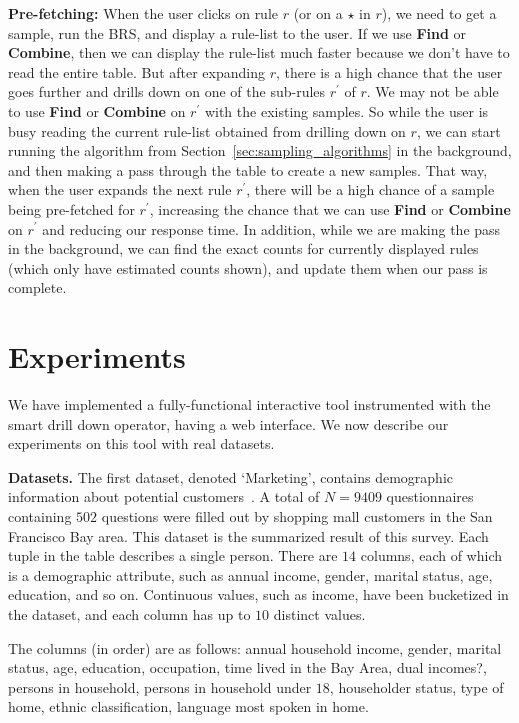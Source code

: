 \documentclass[10pt,journal,compsoc]{IEEEtran}
\newcommand{\stitle}[1]{\vspace{0.5em}\noindent\textbf{#1}}
\newcommand{\techreporttext}[1]{#1}
\begin{document}
\techreporttext{
\noindent \textbf{Pre-fetching:} When the user clicks on rule $r$ (or on a $\star$ in $r$), we need to get a sample, run the BRS, and display a rule-list to the user. If we use \textbf{Find} or \textbf{Combine}, then we can display the rule-list much faster because we don't have to read the entire table. But after expanding $r$, there is a high chance that the user goes further and drills down on one of the sub-rules $r^{\prime}$ of $r$. We may not be able to use \textbf{Find} or \textbf{Combine} on $r^{\prime}$ with the existing samples. So while the user is busy reading the current rule-list obtained from drilling down on $r$, we can start running the algorithm from Section~\ref{sec:sampling_algorithms} in the background, and then making a pass through the table to create a new samples. That way, when the user expands the next rule $r^{\prime}$, there will be a high chance of a sample being pre-fetched for $r^{\prime}$, increasing the chance that we can use \textbf{Find} or \textbf{Combine} on $r^{\prime}$ and reducing our response time.
In addition, while we are making the pass in the background, we can find the exact counts for currently displayed rules (which only have estimated counts shown), and update them when our pass is complete.
}

\section{Experiments}\label{sec:experiments}
We have implemented a fully-functional interactive tool instrumented with the smart drill down operator, having a web interface.
We now describe our experiments on this tool with real datasets.

\stitle{Datasets.} The first dataset, denoted `Marketing', contains demographic information about potential customers~\cite{dataset1}. A total of $N=9409$ questionnaires containing $502$ questions were filled out by shopping mall customers in the San Francisco Bay area. This dataset is the summarized result of this survey. Each tuple in the table describes a single person. There are $14$ columns, each of which is a demographic attribute, such as annual income, gender, marital status, age, education, and so on. Continuous values, such as income, have been bucketized in the dataset, and each column has up to $10$ distinct values.

The columns (in order) are as follows:
annual household income, gender, marital status, age, education, occupation, time lived in the Bay Area, dual incomes?, persons in household, persons in household under $18$, householder status, type of home, ethnic classification, language most spoken in home.
\end{document}
